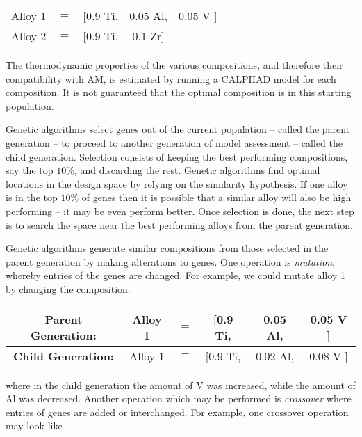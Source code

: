 \begin{table}[h!]
\begin{center}
\begin{tabular}{ccccc}
	Alloy 1 & $=$ & [0.9 Ti, & 0.05 Al, & 0.05 V ] \\
	Alloy 2 & $=$ & [0.9 Ti, & 0.1 Zr] & \\
\end{tabular}
\end{center}
\end{table}
The thermodynamic properties of the various compositions, and therefore their compatibility with AM, is estimated by running a CALPHAD model for each composition. It is not guaranteed that the optimal composition is in this starting population.

Genetic algorithms select genes out of the current population -- called the parent generation --  to proceed to another generation of model assessment -- called the child generation. Selection consists of keeping the best performing compositions, say the top $10\%$, and discarding the rest. Genetic algorithms find optimal locations in the design space by relying on the similarity hypothesis. If one alloy is in the top $10\%$ of genes then it is possible that a similar alloy will also be high performing -- it may be even perform better. Once selection is done, the next step is to search the space near the best performing alloys from the parent generation.

Genetic algorithms generate similar compositions from those selected in the parent generation by making alterations to genes. One operation is \textit{mutation}, whereby entries of the genes are changed. For example, we could mutate alloy 1 by changing the composition:

\begin{table}[h!]
\begin{center}
\begin{tabular}{c|ccccc}
	\textbf{Parent Generation:} & Alloy 1 & $=$ & [0.9 Ti, & {\color{red}0.05} Al, & {\color{red}0.05} V ] \\ \hline
	\textbf{Child Generation:} & Alloy 1 & $=$ & [0.9 Ti, & {\color{green}0.02} Al, & {\color{green}0.08} V  ]  \\ 
\end{tabular}
\end{center}
\end{table}
\noindent where in the child generation the amount of V was increased, while the amount of Al was decreased. Another operation which may be performed is \textit{crossover} where entries of genes are added or interchanged. For example, one crossover operation may look like

